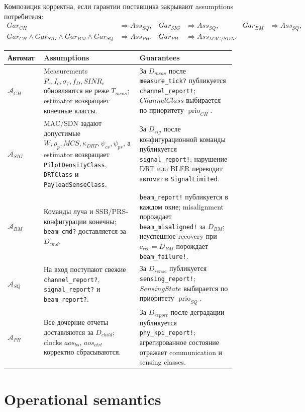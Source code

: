 \documentclass[10pt,a4paper]{article}
\newcommand{\code}[1]{\texttt{#1}}
\newcommand{\A}[1]{\mathcal{A}_{#1}}
\newcommand{\prio}{\operatorname{prio}}
\begin{document}
Композиция корректна, если гарантии поставщика закрывают assumptions потребителя:
\begin{align}
Gar_{CH}&\Rightarrow Ass_{SQ},& Gar_{SIG}&\Rightarrow Ass_{SQ},& Gar_{BM}&\Rightarrow Ass_{SQ},\\
Gar_{CH}\wedge Gar_{SIG}\wedge Gar_{BM}\wedge Gar_{SQ}&\Rightarrow Ass_{PH},& Gar_{PH}&\Rightarrow Ass_{MAC/SDN}.
\end{align}

\begin{longtable}{|p{0.12\linewidth}|p{0.39\linewidth}|p{0.39\linewidth}|}
\hline
Автомат & Assumptions & Guarantees \\
\hline
\(\A{CH}\) & Measurements \(P_r,I_c,\sigma_\tau,f_D,SINR_c\) обновляются не реже \(T_{meas}\); estimator возвращает конечные классы. & За \(D_{meas}\) после \code{measure\_tick?} публикуется \code{channel\_report!}; \(ChannelClass\) выбирается по приоритету \(\prio_{CH}\). \\
\hline
\(\A{SIG}\) & MAC/SDN задают допустимые \(W,\rho_p,MCS,\kappa_{DRT},\psi_{cs},\psi_{ps}\), а estimator возвращает \code{PilotDensityClass}, \code{DRTClass} и \code{PayloadSenseClass}. & За \(D_{sig}\) после конфигурационной команды публикуется \code{signal\_report!}; нарушение DRT или BLER переводит автомат в \code{SignalLimited}. \\
\hline
\(\A{BM}\) & Команды луча и SSB/PRS-конфигурации конечны; \code{beam\_cmd?} доставляется за \(D_{cmd}\). & \code{beam\_report!} публикуется в каждом окне; misalignment порождает \code{beam\_misaligned!} за \(D_{BM}\); неуспешное recovery при \(c_{rec}=D_{BM}\) порождает \code{beam\_failure!}. \\
\hline
\(\A{SQ}\) & На вход поступают свежие \code{channel\_report?}, \code{signal\_report?} и \code{beam\_report?}. & За \(D_{sense}\) публикуется \code{sensing\_report!}; \(SensingState\) выбирается по приоритету \(\prio_{SQ}\). \\
\hline
\(\A{PH}\) & Все дочерние отчеты доставляются за \(D_{child}\); clocks \(aos_{bs}\), \(aos_{ctrl}\) корректно сбрасываются. & За \(D_{report}\) после деградации публикуется \code{phy\_kpi\_report!}; агрегированное состояние отражает communication и sensing classes. \\
\hline
\end{longtable}

\section{Operational semantics}
\end{document}

